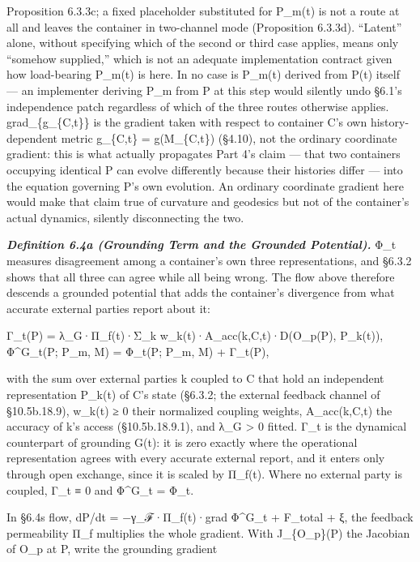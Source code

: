 \documentclass[
]{article}
\begin{document}
Proposition 6.3.3c; a fixed placeholder substituted for P\_m(t) is not a
route at all and leaves the container in two-channel mode (Proposition
6.3.3d). ``Latent'' alone, without specifying which of the second or
third case applies, means only ``somehow supplied,'' which is not an
adequate implementation contract given how load-bearing P\_m(t) is here.
In no case is P\_m(t) derived from P(t) itself --- an implementer
deriving P\_m from P at this step would silently undo §6.1's
independence patch regardless of which of the three routes otherwise
applies. grad\_\{g\_\{C,t\}\} is the gradient taken with respect to
container C's own history-dependent metric g\_\{C,t\} = g(M\_\{C,t\})
(§4.10), not the ordinary coordinate gradient: this is what actually
propagates Part 4's claim --- that two containers occupying identical P
can evolve differently because their histories differ --- into the
equation governing P's own evolution. An ordinary coordinate gradient
here would make that claim true of curvature and geodesics but not of
the container's actual dynamics, silently disconnecting the two.

\emph{\textbf{Definition 6.4a (Grounding Term and the Grounded
Potential).}} Φ\_t measures disagreement among a container's own three
representations, and §6.3.2 shows that all three can agree while all
being wrong. The flow above therefore descends a grounded potential that
adds the container's divergence from what accurate external parties
report about it:

Γ\_t(P) = λ\_G·Π\_f(t)·Σ\_k w\_k(t)·A\_acc(k,C,t)·D(O\_p(P), P\_k(t)),
Φ\^{}G\_t(P; P\_m, M) = Φ\_t(P; P\_m, M) + Γ\_t(P),

with the sum over external parties k coupled to C that hold an
independent representation P\_k(t) of C's state (§6.3.2; the external
feedback channel of §10.5b.18.9), w\_k(t) ≥ 0 their normalized coupling
weights, A\_acc(k,C,t) the accuracy of k's access (§10.5b.18.9.1), and
λ\_G \textgreater{} 0 fitted. Γ\_t is the dynamical counterpart of
grounding G(t): it is zero exactly where the operational representation
agrees with every accurate external report, and it enters only through
open exchange, since it is scaled by Π\_f(t). Where no external party is
coupled, Γ\_t ≡ 0 and Φ\^{}G\_t = Φ\_t.

In §6.4\textquotesingle s flow, dP/dt = −γ\_ℱ·Π\_f(t)·grad Φ\^{}G\_t +
F\_total + ξ, the feedback permeability Π\_f multiplies the whole
gradient. With J\_\{O\_p\}(P) the Jacobian of O\_p at P, write the
grounding gradient
\end{document}
